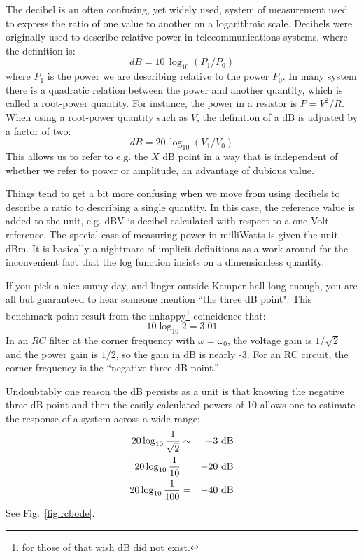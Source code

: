 \documentclass[12pt,oneside]{book}
\begin{document}
The decibel is an often confusing, yet widely used, system of measurement used to express the ratio of one value to another on a logarithmic scale.  Decibels were originally used to describe relative power in telecommunications systems, where the definition is:
\begin{equation}
dB = 10 \, \log_{10}(P_1 / P_0)
\end{equation}
where $P_1$ is the power we are describing relative to the power $P_0$.  In many system there is a quadratic relation between the power and another quantity, which is called a root-power quantity.
For instance, the power in a resistor is $P=V^2/R$.  When using a root-power quantity such as $V$, the definition of a dB is adjusted by a factor of two:
\begin{equation}
dB = 20 \, \log_{10}(V_1 / V_0)
\end{equation}
This allows us to refer to e.g. the $X$ dB point in a way that is independent of whether we refer to power or amplitude, an advantage of dubious value.

Things tend to get a bit more confusing when we move from using decibels to describe a ratio to describing a single quantity.  In this case, the reference value is added to the unit, e.g. dBV is decibel calculated with respect to a one Volt reference.   The special case of measuring power in milliWatts is given the unit dBm.  It is basically a nightmare of implicit definitions as a work-around for the inconvenient fact that the log function insists on a dimensionless quantity.

If you pick a nice sunny day, and linger outside Kemper hall long enough, you are all but guaranteed to hear someone mention ``the three dB point".   This benchmark point result from the unhappy\footnote{for those of that wish dB did not exist.} coincidence that:
\begin{equation*}
10 \log_{10} 2 = 3.01
\end{equation*}
In an $RC$ filter at the corner frequency with $\omega = \omega_0$, the voltage gain is $1/\sqrt{2}$ and the power gain is $1/2$, so the gain in dB is nearly -3.  For an RC circuit, the corner frequency is the ``negative three dB point.''

Undoubtably one reason the dB persists as a unit is that knowing the negative three dB point and then the easily calculated powers of 10 allows one to estimate the response of a system across a wide range:
\begin{eqnarray*}
20 \log_{10} \frac{1}{\sqrt{2}} &\sim& -3~\rm dB\\
20 \log_{10} \frac{1}{10} &=& -20~\rm dB\\
20 \log_{10} \frac{1}{100} &=& -40~\rm dB\\
\end{eqnarray*}
See Fig.~\ref{fig:rcbode}.
\end{document}
